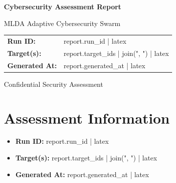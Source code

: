 \documentclass[11pt,a4paper]{article}
\begin{document}

\begin{titlepage}

    \centering

    \vspace*{3cm}

    {\Huge\bfseries Cybersecurity Assessment Report\par}

    \vspace{1cm}

    {\Large MLDA Adaptive Cybersecurity Swarm\par}

    \vfill

    \begin{tabular}{ll}

        \textbf{Run ID:}
        &
        {{ report.run_id | latex }}
        \\

        \textbf{Target(s):}
        &
        {{ report.target_ids | join(", ") | latex }}
        \\

        \textbf{Generated At:}
        &
        {{ report.generated_at | latex }}
        \\

    \end{tabular}

    \vfill

    {\large Confidential Security Assessment}

\end{titlepage}



\tableofcontents

\newpage



\section{Assessment Information}

\begin{itemize}[leftmargin=*]

    \item \textbf{Run ID:}
    {{ report.run_id | latex }}

    \item \textbf{Target(s):}
    {{ report.target_ids | join(", ") | latex }}

    \item \textbf{Generated At:}
    {{ report.generated_at | latex }}

\end{itemize}
\end{document}
